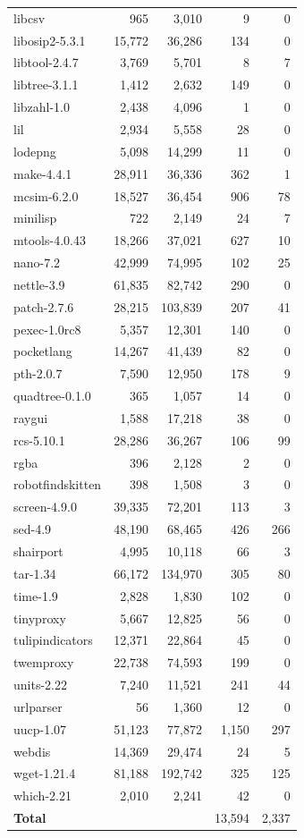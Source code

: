 \begin{table}[t]
\begin{tabular}{@{~}l@{~}||@{~}r@{~}|@{~}r@{~}|@{~}r@{~}|@{~}r@{~}}
libcsv&965&3,010&9&0\\
libosip2-5.3.1&15,772&36,286&134&0\\
libtool-2.4.7&3,769&5,701&8&7\\
libtree-3.1.1&1,412&2,632&149&0\\
libzahl-1.0&2,438&4,096&1&0\\
lil&2,934&5,558&28&0\\
lodepng&5,098&14,299&11&0\\
make-4.4.1&28,911&36,336&362&1\\
mcsim-6.2.0&18,527&36,454&906&78\\
minilisp&722&2,149&24&7\\
mtools-4.0.43&18,266&37,021&627&10\\
nano-7.2&42,999&74,995&102&25\\
nettle-3.9&61,835&82,742&290&0\\
patch-2.7.6&28,215&103,839&207&41\\
pexec-1.0rc8&5,357&12,301&140&0\\
pocketlang&14,267&41,439&82&0\\
pth-2.0.7&7,590&12,950&178&9\\
quadtree-0.1.0&365&1,057&14&0\\
raygui&1,588&17,218&38&0\\
rcs-5.10.1&28,286&36,267&106&99\\
rgba&396&2,128&2&0\\
robotfindskitten&398&1,508&3&0\\
screen-4.9.0&39,335&72,201&113&3\\
sed-4.9&48,190&68,465&426&266\\
shairport&4,995&10,118&66&3\\
tar-1.34&66,172&134,970&305&80\\
time-1.9&2,828&1,830&102&0\\
tinyproxy&5,667&12,825&56&0\\
tulipindicators&12,371&22,864&45&0\\
twemproxy&22,738&74,593&199&0\\
units-2.22&7,240&11,521&241&44\\
urlparser&56&1,360&12&0\\
uucp-1.07&51,123&77,872&1,150&297\\
webdis&14,369&29,474&24&5\\
wget-1.21.4&81,188&192,742&325&125\\
which-2.21&2,010&2,241&42&0\\\hline
{\bf Total}&&&13,594&2,337\\
  \end{tabular}
  \vspace{-1em}
\end{table}

